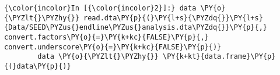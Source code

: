    \begin{Verbatim}[commandchars=\\\{\}]
{\color{incolor}In [{\color{incolor}2}]:} data \PY{o}{\PYZlt{}\PYZhy{}} read.dta\PY{p}{(}\PY{l+s}{\PYZdq{}}\PY{l+s}{Data/SEED\PYZus{}endline\PYZus{}analysis.dta\PYZdq{}}\PY{p}{,} convert.factors\PY{o}{=}\PY{k+kc}{FALSE}\PY{p}{,} convert.underscore\PY{o}{=}\PY{k+kc}{FALSE}\PY{p}{)}
        data \PY{o}{\PYZlt{}\PYZhy{}} \PY{k+kt}{data.frame}\PY{p}{(}data\PY{p}{)}
\end{Verbatim}
